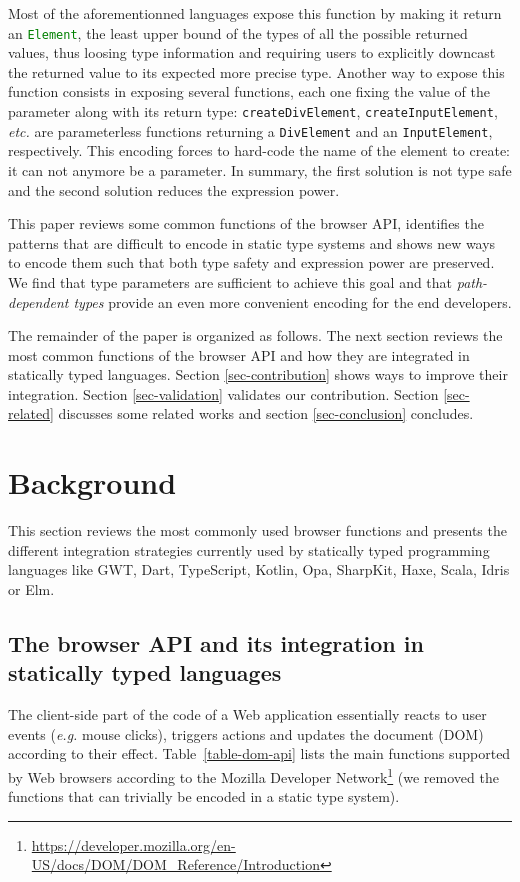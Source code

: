 \documentclass{llncs}
\newcommand{\jscode}[1]{\lstinline[language=JavaScript]|#1|}
\begin{document}
Most of the aforementionned languages expose this function by making it return an \jscode{Element}, the least upper bound of the types of all the possible returned values, thus loosing type information and requiring users to explicitly downcast the returned value to its expected more precise type. Another way to expose this function consists in exposing several functions, each one fixing the value of the parameter along with its return type: \jscode{createDivElement}, \jscode{createInputElement}, \emph{etc.} are parameterless functions returning a \jscode{DivElement} and an \jscode{InputElement}, respectively. This encoding forces to hard-code the name of the element to create: it can not anymore be a parameter. In summary, the first solution is not type safe and the second solution reduces the expression power.

This paper reviews some common functions of the browser API, identifies the patterns that are difficult to encode in static type systems and shows new ways to encode them such that both type safety and expression power are preserved. We find that type parameters are sufficient to achieve this goal and that \emph{path-dependent types} provide an even more convenient encoding for the end developers.

The remainder of the paper is organized as follows. The next section reviews the most common functions of the browser API and how they are integrated in statically typed languages. Section \ref{sec-contribution} shows ways to improve their integration. Section \ref{sec-validation} validates our contribution. Section \ref{sec-related} discusses some related works and section \ref{sec-conclusion} concludes.

\section{Background}
\label{sec-background}

This section reviews the most commonly used browser functions and presents the different integration strategies currently used by statically typed programming languages like GWT, Dart, TypeScript, Kotlin, Opa, SharpKit, Haxe, Scala, Idris or Elm.

\subsection{The browser API and its integration in statically typed languages}

The client-side part of the code of a Web application essentially reacts to user events (\emph{e.g.} mouse clicks), triggers actions and updates the document (DOM) according to their effect. Table~\ref{table-dom-api} lists the main functions supported by Web browsers according to the Mozilla Developer Network\footnote{\href{https://developer.mozilla.org/en-US/docs/DOM/DOM\_Reference/Introduction}{https://developer.mozilla.org/en-US/docs/DOM/DOM\_Reference/Introduction}} (we removed the functions that can trivially be encoded in a static type system).
\end{document}
